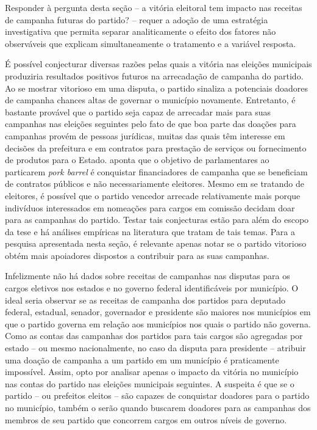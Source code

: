 Responder à pergunta desta seção -- a vitória eleitoral tem impacto nas receitas de campanha futuras do partido? -- requer a adoção de uma estratégia investigativa que permita separar analiticamente o efeito dos fatores não observáveis que explicam simultaneamente o tratamento e a variável resposta.

É possível conjecturar diversas razões pelas quais a vitória nas eleições municipais produziria resultados positivos futuros na arrecadação de campanha do partido. Ao se mostrar vitorioso em uma disputa, o partido sinaliza a potenciais doadores de campanha chances altas de governar o município novamente. Entretanto, é bastante provável que o partido seja capaz de arrecadar mais para suas campanhas nas eleições seguintes pelo fato de que boa parte das doações para campanhas provém de pessoas jurídicas, muitas das quais têm interesse em decisões da prefeitura e em contratos para prestação de serviços ou fornecimento de produtos para o Estado. \citet{Samuels2008a} aponta que o objetivo de parlamentares ao particarem \emph{pork barrel} é conquistar financiadores de campanha que se beneficiam de contratos públicos e não necessariamente eleitores. Mesmo em se tratando de eleitores, é possível que o partido vencedor arrecade relativamente mais porque indivíduos interessados em nomeações para cargos em comissão decidam doar para as campanhas do partido. Testar tais conjecturas estão para além do escopo da tese e há análises empíricas na literatura que tratam de tais temas. Para a pesquisa apresentada nesta seção, é relevante apenas notar se o partido vitorioso obtém mais apoiadores dispostos a contribuir para as suas campanhas.

Infelizmente não há dados sobre receitas de campanhas nas disputas para os cargos eletivos nos estados e no governo federal identificáveis por município. O ideal seria observar se as receitas de campanha dos partidos para deputado federal, estadual, senador, governador e presidente são maiores nos municípios em que o partido governa em relação aos municípios nos quais o partido não governa. Como as contas das campanhas dos partidos para tais cargos são agregadas por estado -- ou mesmo nacionalmente, no caso da disputa para presidente -- atribuir uma doação de campanha a um partido em um município é praticamente impossível. Assim, opto por analisar apenas o impacto da vitória no município nas contas do partido nas eleições municipais seguintes. A suspeita é que se o partido -- ou prefeitos eleitos -- são capazes de conquistar doadores para o partido no município, também o serão quando buscarem doadores para as campanhas dos membros de seu partido que concorrem cargos em outros níveis de governo.

